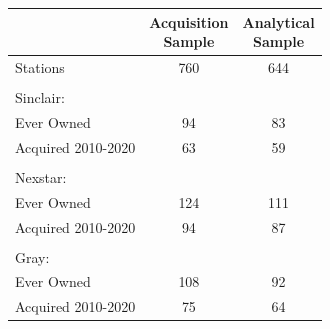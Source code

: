 {
\def\sym#1{\ifmmode^{#1}\else\(^{#1}\)\fi}
\begin{tabular}{l*{1}{cc}}
\toprule
                    &\shortstack{Acquisition\\Sample}&\shortstack{Analytical\\Sample}\\
\midrule
Stations            &         760&         644\\
\\ Sinclair:\\Ever Owned&          94&          83\\
Acquired 2010-2020  &          63&          59\\
\\ Nexstar:\\Ever Owned&         124&         111\\
Acquired 2010-2020  &          94&          87\\
\\ Gray:\\Ever Owned&         108&          92\\
Acquired 2010-2020  &          75&          64\\
\bottomrule
\end{tabular}
}
